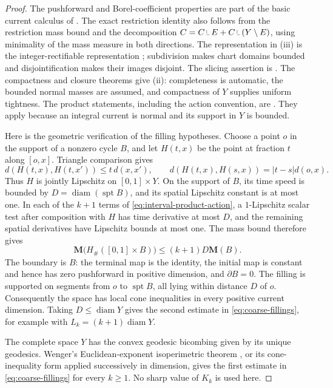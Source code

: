 \documentclass[11pt]{article}
\numberwithin{equation}{section}
\theoremstyle{definition}
\theoremstyle{remark}
\newcommand{\M}{\mathbf M}
\newcommand{\spt}{\operatorname{spt}}
\newcommand{\restr}{\mathbin{\vrule height 1.4ex depth -0.3ex width .07ex\vrule height .07ex depth 0ex width .7ex}}
\DeclareMathOperator{\diam}{diam}
\begin{document}
\begin{proof}
The pushforward and Borel-coefficient properties are part of the basic
current calculus of \cite{AK2000}. The exact restriction identity also
follows from the restriction mass bound and the decomposition
\(C=C\restr E+C\restr(Y\setminus E)\), using minimality of the mass
measure in both directions. The representation in (iii) is the
integer-rectifiable representation
\cite[Lemma~4.1 and Theorem~4.5]{AK2000}; subdivision makes chart domains
bounded and disjointification makes their images disjoint. The slicing
assertion is \cite[Theorems~5.6--5.7]{AK2000}. The compactness and closure
theorems \cite[Theorems~5.2 and~8.5]{AK2000} give (ii): completeness is
automatic, the bounded normal masses are assumed, and compactness of
\(Y\) supplies uniform tightness. The product statements, including the
action convention, are
\cite[Definition~3.1 and Theorem~3.2]{Wenger2007Flat}. They apply because
an integral current is normal and its support in \(Y\) is bounded.

Here is the geometric verification of the filling hypotheses. Choose a
point \(o\) in the support of a nonzero cycle \(B\), and let
\(H(t,x)\) be the point at fraction \(t\) along \([o,x]\).
Triangle comparison gives
\[
 d(H(t,x),H(t,x'))\le t\,d(x,x'),\qquad
 d(H(t,x),H(s,x))=|t-s|d(o,x).
\]
Thus \(H\) is jointly Lipschitz on \([0,1]\times Y\).
On the support of \(B\), its time speed is bounded by
\(D=\diam(\spt B)\), and its spatial Lipschitz constant is at most one.
In each of the \(k+1\) terms of \eqref{eq:interval-product-action}, a
\(1\)-Lipschitz scalar test after composition with \(H\) has time
derivative at most \(D\), and the remaining spatial derivatives have
Lipschitz bounds at most one. The mass bound therefore gives
\begin{equation}
\label{eq:cone-mass-bound}
 \M\bigl(H_\#([0,1]\times B)\bigr)
 \le (k+1)D\M(B).
\end{equation}
The boundary is \(B\): the terminal map is the identity, the initial
map is constant and hence has zero pushforward in positive dimension,
and \(\partial B=0\). The filling is supported on segments from \(o\)
to \(\spt B\), all lying within distance \(D\) of \(o\).
Consequently the space has local cone inequalities in every positive
current dimension. Taking \(D\le\diam Y\) gives the second estimate
in \eqref{eq:coarse-fillings}, for example with
\(L_k=(k+1)\diam Y\).

The complete space \(Y\) has the convex geodesic bicombing given by its
unique geodesics. Wenger's Euclidean-exponent isoperimetric theorem
\cite[Theorem~1.2 and Corollary~1.4]{Wenger2005Iso}, or its cone-inequality
form applied successively in dimension, gives the first estimate in
\eqref{eq:coarse-fillings} for every \(k\ge1\). No sharp value of
\(K_k\) is used here.


\end{proof}
\end{document}
